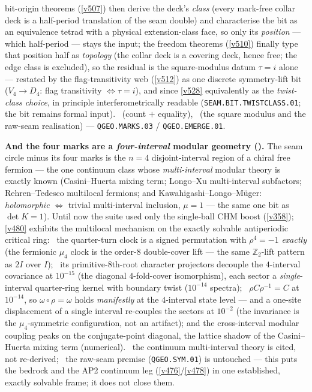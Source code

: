 \documentclass[11pt,a4paper]{article}
\newcommand{\Z}{\mathbb Z}
\begin{document}
\begin{keybox}
bit-origin theorems (\vref{v507}) then derive the deck's \emph{class} (every mark-free collar deck
is a half-period translation of the seam double) and characterise the bit as an equivalence tetrad
with a physical extension-class face, so only its \emph{position} --- which half-period --- stays
the input; the freedom theorems (\vref{v510}) finally type that position half as \emph{topology}
(the collar deck is a covering deck, hence free; the edge class is excluded), so the residual is the
square-modulus datum $\tau=i$ alone --- restated by the flag-transitivity web (\vref{v512}) as one
discrete symmetry-lift bit ($V_4\to D_4$: flag transitivity $\iff\tau=i$), and since \vref{v528}
equivalently as the \emph{twist-class choice}, in principle interferometrically readable
(\texttt{SEAM.BIT.TWISTCLASS.01}; the bit remains formal input).
\mE\ (count $+$ equality), \mO\ (the square modulus and the raw-seam realisation) --- \texttt{QGEO.MARKS.03} /
\texttt{QGEO.EMERGE.01}.
\par\smallskip\noindent\textbf{And the four marks are a \emph{four-interval} modular geometry
().} The seam circle minus its four marks is the $n{=}4$
disjoint-interval region of a chiral free fermion --- the one continuum class whose \emph{multi-interval}
modular theory is exactly known (Casini--Huerta mixing term; Longo--Xu multi-interval subfactors;
Rehren--Tedesco multilocal fermions; and Kawahigashi--Longo--M\"uger: \emph{holomorphic} $\Leftrightarrow$
trivial multi-interval inclusion, $\mu{=}1$ --- the same one bit as $\det K{=}1$). Until now the suite used
only the single-ball CHM boost (\vref{v358}); \vref{v480} exhibits the multilocal mechanism on the exactly
solvable antiperiodic critical ring: \mE\ the quarter-turn clock is a signed permutation with
$\rho^4{=}{-}1$ \emph{exactly} (the fermionic $\mu_4$ clock is the order-$8$ double-cover lift --- the same
$\Z_2$-lift pattern as $2I$ over $I$); \mE\ its primitive-$8$th-root character projectors decouple the
$4$-interval covariance at $10^{-15}$ (the diagonal $4$-fold-cover isomorphism), each sector a
\emph{single}-interval quarter-ring kernel with boundary twist ($10^{-14}$ spectra); \mE\
$\rho C\rho^{-1}{=}C$ at $10^{-14}$, so $\omega{\circ}\rho{=}\omega$ holds \emph{manifestly} at the
$4$-interval state level --- and a one-site displacement of a single interval re-couples the sectors at
$10^{-2}$ (the invariance is the $\mu_4$-symmetric configuration, not an artifact); and the cross-interval
modular coupling peaks on the conjugate-point diagonal, the lattice shadow of the Casini--Huerta mixing
term (numerical). \mC\ the continuum multi-interval theory is cited, not re-derived; \mO\ the raw-seam premise
(\texttt{QGEO.SYM.01}) is untouched --- this puts the bedrock and the AP2 continuum leg (\vref{v476}/\vref{v478})
in one established, exactly solvable frame; it does not close them.
\end{keybox}
\end{document}
